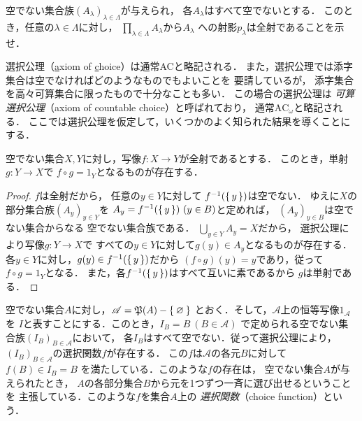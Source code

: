   \begin{que} \label{que:prozensya}
    空でない集合族$(A_{\lambda})_{\lambda \in \varLambda}$が与えられ，
    各$A_{\lambda}$はすべて空でないとする．
    このとき，任意の$\lambda \in \varLambda$に対し，
    $\prod_{\lambda \in \varLambda} A_{\lambda}$から$A_{\lambda}$
    への射影$p_{\lambda}$は全射であることを示せ．
  \end{que}



  選択公理（\underline{a}xiom of \underline{c}hoice）は通常ACと略記される．
  また，選択公理では添字集合は空でなければどのようなものでもよいことを
  要請しているが，
  添字集合を高々可算集合に限ったもので十分なことも多い．
  この場合の選択公理は
  \emph{可算選択公理}（axiom of countable choice）と呼ばれており，
  通常$\mathrm{AC}_ {\omega}$と略記される．
  ここでは選択公理を仮定して，いくつかのよく知られた結果を導くことにする．

  \begin{thm} \label{thm:zensyagyaku}
    空でない集合$X,Y$に対し，写像$f:X \longrightarrow Y$が全射であるとする．
    このとき，単射$g: Y \longrightarrow X$で
    $f \circ g = 1_{Y}$となるものが存在する．
  \end{thm}

  \begin{proof}
    $f$は全射だから，
    任意の$y \in Y$に対して
    $f^{-1}( \set{y} )$は空でない．
    ゆえに$X$の部分集合族$(A_{y})_{y \in Y}$を
    $A_{y} = f^{-1}(\set{y}) \ (y \in B)$と定めれば，
    $(A_{y})_{y \in B}$は空でない集合からなる
    空でない集合族である．
    $\bigcup_{y \in Y} A_y = X$だから，
    選択公理により写像$g: Y \longrightarrow X$で
    すべての$y \in Y$に対して$g(y) \in A_y$となるものが存在する．
    各$y \in Y$に対し，$g(y) \in f^{-1} (\set{y})$だから
    $(f \circ g)(y) = y$であり，従って$f \circ g= 1_Y$となる．
    また，各$f^{-1} ( \set{y})$はすべて互いに素であるから
    $g$は単射である．
  \end{proof}



  空でない集合$A$に対し，$\mathscr{A} = \mathfrak{P}(A) - \Set{ \varnothing}$
  とおく．そして，$\mathscr{A}$上の恒等写像$1_{\mathscr{A}}$を
  $I$と表すことにする．このとき，$I_B=B \ (B \in \mathscr{A})$
  で定められる空でない集合族$(I_B)_{B \in \mathscr{A}}$において，
  各$I_B$はすべて空でない．従って選択公理により，
  $(I_B)_{B \in \mathscr{A}}$の選択関数$f$が存在する．
  この$f$は$\mathscr{A}$の各元$B$に対して$f(B) \in I_B=B$
  を満たしている．このような$f$の存在は，
  空でない集合$A$が与えられたとき，
  $A$の各部分集合$B$から元を1つずつ一斉に選び出せるということを
  主張している．このような$f$を集合$A$上の
  \emph{選択関数}（choice function）という．


